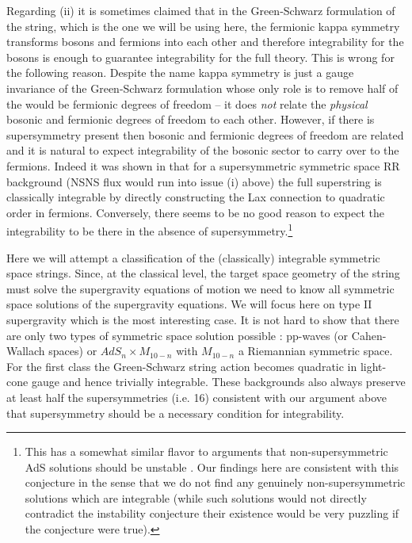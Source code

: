 \documentclass[a4paper,11pt]{article}
\begin{document}
Regarding (ii) it is sometimes claimed that in the Green-Schwarz formulation of the string, which is the one we will be using here, the fermionic kappa symmetry transforms bosons and fermions into each other and therefore integrability for the bosons is enough to guarantee integrability for the full theory. This is wrong for the following reason. Despite the name kappa symmetry is just a gauge invariance of the Green-Schwarz formulation whose only role is to remove half of the would be fermionic degrees of freedom -- it does \emph{not} relate the \emph{physical} bosonic and fermionic degrees of freedom to each other. However, if there is supersymmetry present then bosonic and fermionic degrees of freedom are related and it is natural to expect integrability of the bosonic sector to carry over to the fermions. Indeed it was shown in \cite{Wulff:2015mwa} that for a supersymmetric symmetric space RR background (NSNS flux would run into issue (i) above) the full superstring is classically integrable by directly constructing the Lax connection to quadratic order in fermions. Conversely, there seems to be no good reason to expect the integrability to be there in the absence of supersymmetry.\footnote{This has a somewhat similar flavor to arguments that non-supersymmetric AdS solutions should be unstable \cite{Ooguri:2016pdq,Freivogel:2016qwc}. Our findings here are consistent with this conjecture in the sense that we do not find any genuinely non-supersymmetric solutions which are integrable (while such solutions would not directly contradict the instability conjecture their existence would be very puzzling if the conjecture were true).}

Here we will attempt a classification of the (classically) integrable symmetric space strings. Since, at the classical level, the target space geometry of the string must solve the supergravity equations of motion we need to know all symmetric space solutions of the supergravity equations. We will focus here on type II supergravity which is the most interesting case. It is not hard to show that there are only two types of symmetric space solution possible \cite{Figueroa-OFarrill:2012whx}: pp-waves (or Cahen-Wallach spaces) or $AdS_n\times M_{10-n}$ with $M_{10-n}$ a Riemannian symmetric space. For the first class the Green-Schwarz string action becomes quadratic in light-cone gauge and hence trivially integrable. These backgrounds also always preserve at least half the supersymmetries (i.e. 16) consistent with our argument above that supersymmetry should be a necessary condition for integrability.
\end{document}
